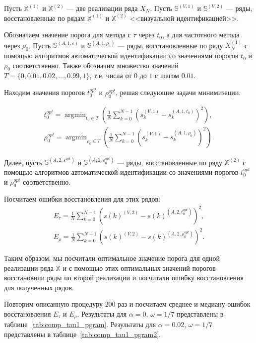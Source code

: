 \documentclass[specialist,
               substylefile = spbu.rtx,
               subf,href,colorlinks=true, 12pt]{disser}
\def\argmin{\mathop{\mathrm{argmin}}}
\begin{document}
Пусть $\mathbb{X}^{(1)}$ и $\mathbb{X}^{(2)}$ --- две реализации ряда $X_N$.
Пусть $\mathbb{S}^{(V,1)}$ и  $\mathbb{S}^{(V,2)}$ --- ряды, восстановленные по рядам $\mathbb{X}^{(1)}$ и $\mathbb{X}^{(2)}$ <<визуальной идентификацией>>.


Обозначаем значение порога для метода с $\tau$ через $t_0$, а для частотного метода через $\rho_0$. 
Пусть $\mathbb{S}^{(A,1,\varepsilon)}$ и  $\mathbb{S}^{(A,1, \rho_0)}$ --- ряды, восстановленные по ряду $X_N^{(1)}$  с помощью алгоритмов автоматической идентификации со значениями порогов $t_0$ и $\rho_0$ соответственно.
Также обозначим множество значений $T = \{0,0.01,0.02,\ldots, 0.99,1\}$, т.е. числа от $0$ до $1$ с шагом $0.01$.

Находим значения порогов $t_0^{opt}$ и $\rho_0^{opt}$, решая следующие задачи минимизации.

\begin{gather*}
t_0^{opt} = \argmin_{t_0 \in T}{\left(\frac{1}{N}\sum_{k=0}^{N-1}{\left(s_k^{(V,1)} - s_k^{(A,1,t_0)}\right)}^2\right)}, \\
\rho_0^{opt} = \argmin_{\rho_0 \in T}{\left(\frac{1}{N}\sum_{k=0}^{N-1}{\left(s_k^{(V,1)} - s_k^{(A,1,\rho_0)}\right)}    ^2\right)}.
\end{gather*}

Далее, пусть  $\mathbb{S}^{(A,2,\varepsilon^{opt})}$ и  $\mathbb{S}^{(A,2, \rho_0^{opt})}$ --- ряды, восстановленные по ряду $\mathbb{X}^{(2)}$  с помощью алгоритмов автоматической идентификации со значениями порогов $t_0^{opt}$ и $\rho_0^{opt}$ соответственно.

Посчитаем ошибки восстановления для этих рядов:
\begin{gather*}
E_{\tau} = \frac{1}{N}\sum_{k=0}^{N-1}{\left(s(k)^{(V,2)} - s(k)^{(A,2,t_0^{opt})}\right)^2}, \\
E_{\rho} = \frac{1}{N}\sum_{k=0}^{N-1}{\left(s(k)^{(V,2)} - s(k)^{(A,2,\rho_0^{opt})}\right)^2}.
\end{gather*}

Таким образом, мы посчитали оптимальное значение порога для одной реализации ряда $\mathbb{X}$ и с помощью этих оптимальных значений порогов восстановили ряды по второй реализации и посчитали ошибку восстановления для полученных рядов.

Повторим описанную процедуру $200$ раз и посчитаем среднее и медиану ошибок восстановления $E_{\tau}$ и $E_{\rho}$. Результаты для $\alpha = 0$, $\omega = 1/7$ представлены в таблице~\ref{tab:comp_tau1_pgram}. Результаты для $\alpha = 0.02$, $\omega = 1/7$ представлены в таблице~\ref{tab:comp_tau1_pgram2}.
\end{document}
